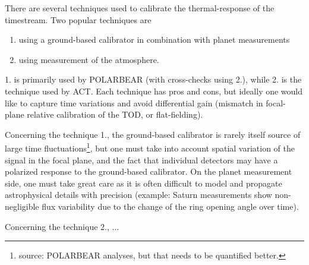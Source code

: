 There are several techniques used to calibrate the thermal-response of the timestream. Two popular techniques are 
\begin{enumerate}
\item{using a ground-based calibrator in combination with planet measurements}
\item{using measurement of the atmosphere.}
\end{enumerate}
1. is primarily used by POLARBEAR (with cross-checks using 2.), while 2. is the technique used by ACT. Each technique has pros and cons, but ideally one would like to capture time variations and avoid differential gain (mismatch in focal-plane relative calibration of the TOD, or flat-fielding).

Concerning the technique 1., the ground-based calibrator is rarely itself source of large time fluctuations\footnote{source: POLARBEAR analyses, but that needs to be quantified better.}, but one must take into account spatial variation of the signal in the focal plane, and the fact that individual detectors may have a polarized response to the ground-based calibrator.
On the planet measurement side, one must take great care as it is often difficult to model and propagate astrophysical details with precision (example: Saturn measurements show non-negligible flux variability due to the change of the ring opening angle over time).

Concerning the technique 2., ...